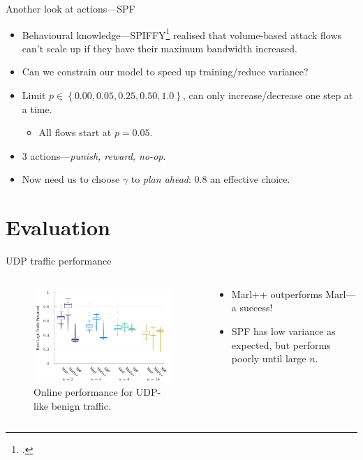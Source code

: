 \documentclass[aspectratio=169,xcolor={dvipsnames}
,hide notes
]{beamer}
\begin{document}
\begin{frame}{Another look at actions---SPF}
\begin{itemize}
	\item Behavioural knowledge---SPIFFY\footcite{DBLP:conf/ndss/KangGS16} realised that \alert{volume-based attack flows can't scale up if they have their maximum bandwidth increased}.
	\item Can we constrain our model to speed up training/reduce variance?
	\item Limit $p \in \left\{ 0.00, 0.05, 0.25, 0.50, 1.0 \right\}$, can only increase/decrease one step at a time.
	\begin{itemize}
		\item All flows start at $p = 0.05$.
	\end{itemize}
	\item \alert{3 actions}---\emph{punish, reward, no-op}.
	\item Now need us to choose $\gamma$ to \emph{plan ahead}: 0.8 an effective choice.
\end{itemize}
\end{frame}

\section{Evaluation}
\begin{frame}{UDP traffic performance}
\begin{columns}
	\begin{column}{0.7\linewidth}
	\begin{figure}
		\centering
		\includegraphics[width=0.95\linewidth]{../plots/udp-box}
		
		\caption{
			Online performance for UDP-like benign traffic.
			\label{fig:udp-box}
		}
	\end{figure}
	\end{column}
	\begin{column}{0.3\linewidth}
		\begin{itemize}
			\item Marl++ outperforms Marl---a success!
			\item SPF has low variance as expected, but performs poorly until large $n$.
		\end{itemize}
	\end{column}
\end{columns}
\end{frame}
\end{document}
